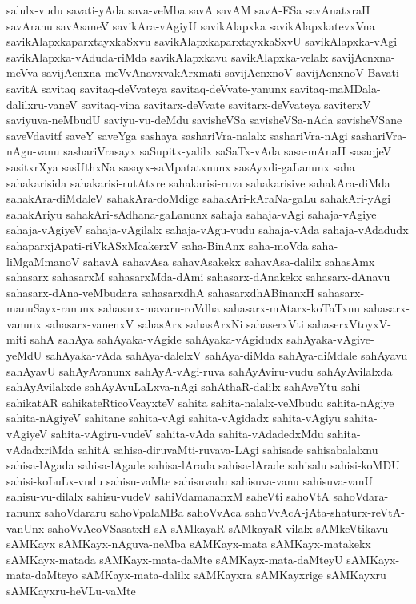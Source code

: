 {salulx-vudu
savati-yAda
sava-veMba
savA
savAM
savA-ESa
savAnatxraH
savAranu
savAsaneV
savikAra-vAgiyU
savikAlapxka
savikAlapxkatevxVna
savikAlapxkaparxtayxkaSxvu
savikAlapxkaparxtayxkaSxvU
savikAlapxka-vAgi
savikAlapxka-vAduda-riMda
savikAlapxkavu
savikAlapxka-velalx
savijAcnxna-meVva
savijAcnxna-meVvAnavxvakArxmati
savijAcnxnoV
savijAcnxnoV-Bavati
savitA
savitaq
savitaq-deVvateya
savitaq-deVvate-yanunx
savitaq-maMDala-dalilxru-vaneV
savitaq-vina
savitarx-deVvate
savitarx-deVvateya
saviterxV
saviyuva-neMbudU
saviyu-vu-deMdu
savisheVSa
savisheVSa-nAda
savisheVSane
saveVdavitf
saveY
saveYga
sashaya
sashariVra-nalalx
sashariVra-nAgi
sashariVra-nAgu-vanu
sashariVrasayx
saSupitx-yalilx
saSaTx-vAda
sasa-mAnaH
sasaqjeV
sasitxrXya
sasUthxNa
sasayx-saMpatatxnunx
sasAyxdi-gaLanunx
saha
sahakarisida
sahakarisi-rutAtxre
sahakarisi-ruva
sahakarisive
sahakAra-diMda
sahakAra-diMdaleV
sahakAra-doMdige
sahakAri-kAraNa-gaLu
sahakAri-yAgi
sahakAriyu
sahakAri-sAdhana-gaLanunx
sahaja
sahaja-vAgi
sahaja-vAgiye
sahaja-vAgiyeV
sahaja-vAgilalx
sahaja-vAgu-vudu
sahaja-vAda
sahaja-vAdadudx
sahaparxjApati-riVkASxMcakerxV
saha-BinAnx
saha-moVda
saha-liMgaMmanoV
sahavA
sahavAsa
sahavAsakekx
sahavAsa-dalilx
sahasAmx
sahasarx
sahasarxM
sahasarxMda-dAmi
sahasarx-dAnakekx
sahasarx-dAnavu
sahasarx-dAna-veMbudara
sahasarxdhA
sahasarxdhABinanxH
sahasarx-manuSayx-ranunx
sahasarx-mavaru-roVdha
sahasarx-mAtarx-koTaTxnu
sahasarx-vanunx
sahasarx-vanenxV
sahasArx
sahasArxNi
sahaserxVti
sahaserxVtoyxV-miti
sahA
sahAya
sahAyaka-vAgide
sahAyaka-vAgidudx
sahAyaka-vAgive-yeMdU
sahAyaka-vAda
sahAya-dalelxV
sahAya-diMda
sahAya-diMdale
sahAyavu
sahAyavU
sahAyAvanunx
sahAyA-vAgi-ruva
sahAyAviru-vudu
sahAyAvilalxda
sahAyAvilalxde
sahAyAvuLaLxva-nAgi
sahAthaR-dalilx
sahAveYtu
sahi
sahikatAR
sahikateRticoVcayxteV
sahita
sahita-nalalx-veMbudu
sahita-nAgiye
sahita-nAgiyeV
sahitane
sahita-vAgi
sahita-vAgidadx
sahita-vAgiyu
sahita-vAgiyeV
sahita-vAgiru-vudeV
sahita-vAda
sahita-vAdadedxMdu
sahita-vAdadxriMda
sahitA
sahisa-diruvaMti-ruvava-LAgi
sahisade
sahisabalalxnu
sahisa-lAgada
sahisa-lAgade
sahisa-lArada
sahisa-lArade
sahisalu
sahisi-koMDU
sahisi-koLuLx-vudu
sahisu-vaMte
sahisuvadu
sahisuva-vanu
sahisuva-vanU
sahisu-vu-dilalx
sahisu-vudeV
sahiVdamananxM
saheVti
sahoVtA
sahoVdara-ranunx
sahoVdararu
sahoVpalaMBa
sahoVvAca
sahoVvAcA-jAta-shaturx-reVtA-vanUnx
sahoVvAcoVSasatxH
sA
sAMkayaR
sAMkayaR-vilalx
sAMkeVtikavu
sAMKayx
sAMKayx-nAguva-neMba
sAMKayx-mata
sAMKayx-matakekx
sAMKayx-matada
sAMKayx-mata-daMte
sAMKayx-mata-daMteyU
sAMKayx-mata-daMteyo
sAMKayx-mata-dalilx
sAMKayxra
sAMKayxrige
sAMKayxru
sAMKayxru-heVLu-vaMte
}
